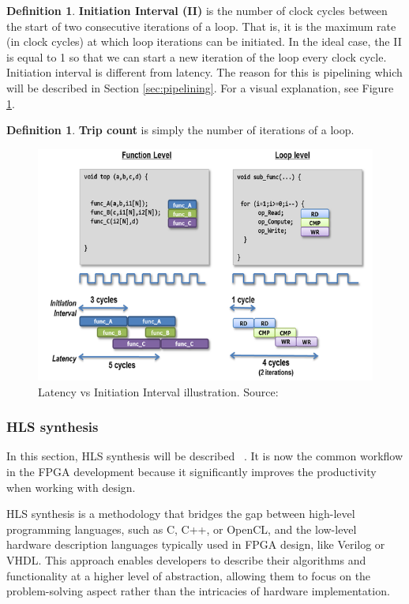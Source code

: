 \documentclass[a4paper, twoside]{report}
\theoremstyle{definition}
\newtheorem{definition}[theorem]{Definition}
\numberwithin{equation}{section}
\begin{document}
\begin{definition}
    \textbf{Initiation Interval (II)} is the number of clock cycles between the start of two consecutive iterations of a loop.
    That is, it is the maximum rate (in clock cycles) at which loop iterations can be initiated.
    In the ideal case, the II is equal to 1 so that we can start a new iteration of the loop every clock cycle.
    Initiation interval is different from latency.
    The reason for this is pipelining which will be described in Section \ref{sec:pipelining}.
    For a visual explanation, see Figure \ref{fig:latency_vs_ii}.
\end{definition}
\begin{definition}
    \textbf{Trip count} is simply the number of iterations of a loop.
\end{definition}

\begin{figure}[h!]
    \centering
    \includegraphics[scale=0.7]{iiandlatency.png}
    \caption{Latency vs Initiation Interval illustration. Source: \cite{VitisYork}}
    \label{fig:latency_vs_ii}
\end{figure}

\subsubsection{HLS synthesis} \label{sec:hls_synthesis}

In this section, HLS synthesis will be described ~\cite{AMD2023VitisHLS}.
It is now the common workflow in the FPGA development because it significantly
improves the productivity when working with design.

HLS synthesis is a methodology that bridges the gap between high-level programming
languages, such as C, C++, or OpenCL, and the low-level hardware description languages
typically used in FPGA design, like Verilog or VHDL. This approach enables developers
to describe their algorithms and functionality at a higher level of abstraction,
allowing them to focus on the problem-solving aspect rather than the intricacies of hardware implementation.
\end{document}
